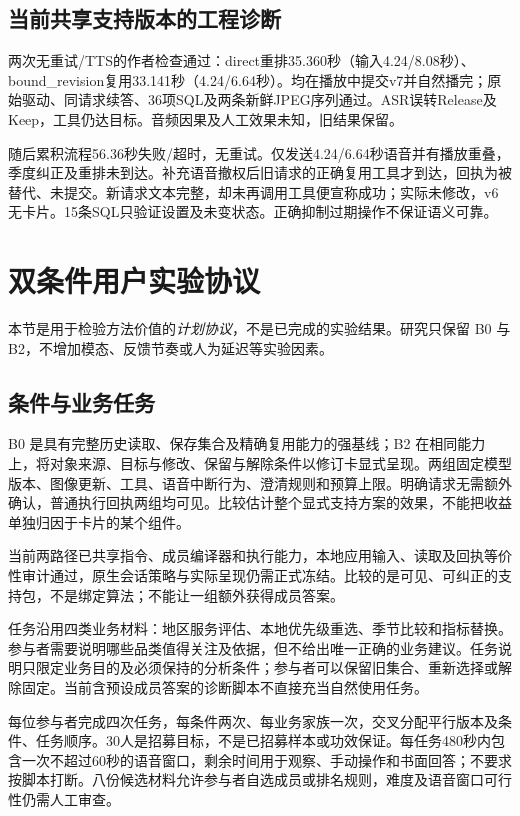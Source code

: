\documentclass[conference]{IEEEtran}
\begin{document}
\subsection{当前共享支持版本的工程诊断}
两次无重试/TTS的作者检查通过：direct重排35.360秒（输入4.24/8.08秒）、bound\_revision复用33.141秒（4.24/6.64秒）。均在播放中提交v7并自然播完；原始驱动、同请求续答、36项SQL及两条新鲜JPEG序列通过。ASR误转Release及Keep，工具仍达目标。音频因果及人工效果未知，旧结果保留。

随后累积流程56.36秒失败/超时，无重试。仅发送4.24/6.64秒语音并有播放重叠，季度纠正及重排未到达。补充语音撤权后旧请求的正确复用工具才到达，回执为被替代、未提交。新请求文本完整，却未再调用工具便宣称成功；实际未修改，v6无卡片。15条SQL只验证设置及未变状态。正确抑制过期操作不保证语义可靠。

\section{双条件用户实验协议}
本节是用于检验方法价值的\emph{计划协议}，不是已完成的实验结果。研究只保留 B0 与 B2，不增加模态、反馈节奏或人为延迟等实验因素。

\subsection{条件与业务任务}
B0 是具有完整历史读取、保存集合及精确复用能力的强基线；B2 在相同能力上，将对象来源、目标与修改、保留与解除条件以修订卡显式呈现。两组固定模型版本、图像更新、工具、语音中断行为、澄清规则和预算上限。明确请求无需额外确认，普通执行回执两组均可见。比较估计整个显式支持方案的效果，不能把收益单独归因于卡片的某个组件。

当前两路径已共享指令、成员编译器和执行能力，本地应用输入、读取及回执等价性审计通过，原生会话策略与实际呈现仍需正式冻结。比较的是可见、可纠正的支持包，不是绑定算法；不能让一组额外获得成员答案。

任务沿用四类业务材料：地区服务评估、本地优先级重选、季节比较和指标替换。参与者需要说明哪些品类值得关注及依据，但不给出唯一正确的业务建议。任务说明只限定业务目的及必须保持的分析条件；参与者可以保留旧集合、重新选择或解除固定。当前含预设成员答案的诊断脚本不直接充当自然使用任务。

每位参与者完成四次任务，每条件两次、每业务家族一次，交叉分配平行版本及条件、任务顺序。30人是招募目标，不是已招募样本或功效保证。每任务480秒内包含一次不超过60秒的语音窗口，剩余时间用于观察、手动操作和书面回答；不要求按脚本打断。八份候选材料允许参与者自选成员或排名规则，难度及语音窗口可行性仍需人工审查。
\end{document}
